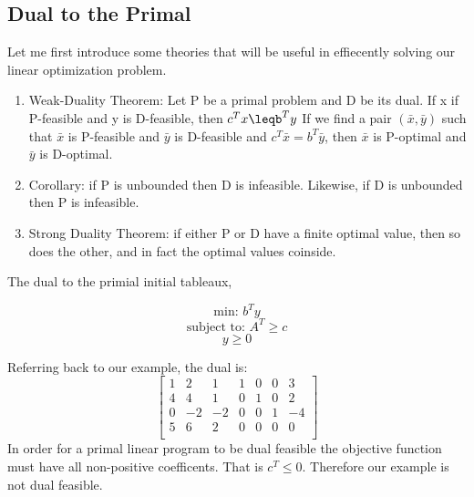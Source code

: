 \documentclass{article}
\begin{document}
\subsection{Dual to the Primal}

Let me first introduce some theories that will be useful in effiecently solving our linear optimization problem.
\begin{enumerate}

\item Weak-Duality Theorem: Let P be a primal problem and D be its dual. If x if P-feasible and y is D-feasible, then $c^Tx\leqb^Ty$
If we find a pair $(\bar{x},\bar{y})$ such that $\bar{x}$ is P-feasible and $\bar{y}$ is D-feasible and $c^T\bar{x}=b^T\bar{y}$, then $\bar{x}$ is P-optimal and $\bar{y}$ is D-optimal.

\item Corollary: if P is unbounded then D is infeasible. Likewise, if D is unbounded then P is infeasible.

\item Strong Duality Theorem: if either P or D have a finite optimal value, then so does the other, and in fact the optimal values coinside.
\end{enumerate}

The dual to the primial initial tableaux,

        $$\textrm{min:\ }  b^Ty$$
        $$\textrm{subject\ to:\ } A^T\geq c$$
            $$y \geq 0$$

Referring back to our example, the dual is:
$$
\left[ \begin{array}{ccccccc}
    1&2&1&1&0&0&3\\
    4&4&1&0&1&0&2\\
    0&-2&-2&0&0&1&-4\\
    5&6&2&0&0&0&0\\ \end{array}\right]
$$
    In order for a primal linear program to be dual feasible the objective function must have all non-positive coefficents. That is $c^T\leq 0$. Therefore our example is not dual feasible.
\end{document}
